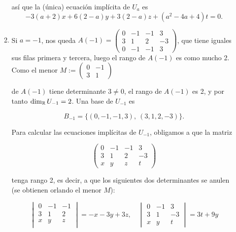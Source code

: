 \documentclass[12pt]{article}
\begin{document}
\begin{ejercicio}[2.5 puntos]
\begin{enumerate}
\begin{enumerate}[label=\roman*.]
				así que la (única) ecuación implícita de $U_a$ es
				\begin{equation*}
					-3(a+2)x + 6(2 - a)y + 3(2 - a)z + (a^2 - 4a + 4)t = 0.
				\end{equation*}
				
				\item Si $a = -1$, nos queda $ \displaystyle A(-1) = 
				\begin{pmatrix}
					0 & -1 & -1 & 3 \\
					3 & 1 & 2 & -3 \\
					0 & -1 & -1 & 3
				\end{pmatrix} $, que tiene iguales sus filas primera y tercera, luego el rango de $A(-1)$ es como mucho 2. Como el menor $ \displaystyle M := \begin{pmatrix}
					0 & -1 \\
					3 & 1 
				\end{pmatrix}$ 
				
				de $A(-1)$ tiene determinante $3 \ne 0$, el rango de $A(-1)$ es 2, y por tanto $\dim_{{\mathbb{R}}} U_{-1} = 2$. Una base de $U_{-1}$ es
				
				\begin{equation*}
					B_{-1} = \{(0, -1, -1, 3),\ (3, 1, 2, -3)\}.
				\end{equation*}
				
				Para calcular las ecuaciones implícitas de $U_{-1}$, obligamos a que la matriz
				
				$$
				\begin{pmatrix}
					0 & -1 & -1 & 3 \\
					3 & 1 & 2 & -3 \\
					x & y & z & t
				\end{pmatrix}
				$$
				
				tenga rango 2, es decir, a que los siguientes dos determinantes se anulen (se obtienen orlando el menor $M$):
				
				$$ \begin{vmatrix}
					0&-1&-1 \\
					3&1&2 \\
					x&y&z \\
				\end{vmatrix} = -x -3y +3z, \quad
				\begin{vmatrix}
					0&-1&3 \\
					3&1&-3 \\
					x&y&t
				\end{vmatrix} = 3t+9y $$
				

\end{enumerate}
\end{enumerate}
\end{ejercicio}
\end{document}
